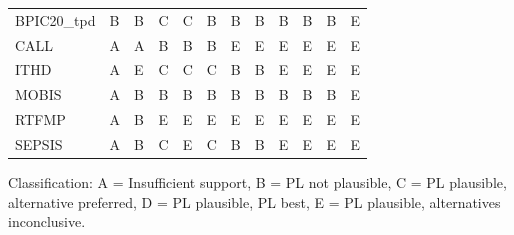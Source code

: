 \begin{tabular}{llllllllllll}
BPIC20\_tpd & \cellcolor[HTML]{D55E00} B & \cellcolor[HTML]{D55E00} B & \cellcolor[HTML]{E69F00} C & \cellcolor[HTML]{E69F00} C & \cellcolor[HTML]{D55E00} B & \cellcolor[HTML]{D55E00} B & \cellcolor[HTML]{D55E00} B & \cellcolor[HTML]{D55E00} B & \cellcolor[HTML]{D55E00} B & \cellcolor[HTML]{D55E00} B & \cellcolor[HTML]{56B4E9} E \\
       CALL & \cellcolor[HTML]{FFFFFF} A & \cellcolor[HTML]{FFFFFF} A & \cellcolor[HTML]{D55E00} B & \cellcolor[HTML]{D55E00} B & \cellcolor[HTML]{D55E00} B & \cellcolor[HTML]{56B4E9} E & \cellcolor[HTML]{56B4E9} E & \cellcolor[HTML]{56B4E9} E & \cellcolor[HTML]{56B4E9} E & \cellcolor[HTML]{56B4E9} E & \cellcolor[HTML]{56B4E9} E \\
       ITHD & \cellcolor[HTML]{FFFFFF} A & \cellcolor[HTML]{56B4E9} E & \cellcolor[HTML]{E69F00} C & \cellcolor[HTML]{E69F00} C & \cellcolor[HTML]{E69F00} C & \cellcolor[HTML]{D55E00} B & \cellcolor[HTML]{D55E00} B & \cellcolor[HTML]{56B4E9} E & \cellcolor[HTML]{56B4E9} E & \cellcolor[HTML]{56B4E9} E & \cellcolor[HTML]{56B4E9} E \\
      MOBIS & \cellcolor[HTML]{FFFFFF} A & \cellcolor[HTML]{D55E00} B & \cellcolor[HTML]{D55E00} B & \cellcolor[HTML]{D55E00} B & \cellcolor[HTML]{D55E00} B & \cellcolor[HTML]{D55E00} B & \cellcolor[HTML]{D55E00} B & \cellcolor[HTML]{D55E00} B & \cellcolor[HTML]{D55E00} B & \cellcolor[HTML]{D55E00} B & \cellcolor[HTML]{56B4E9} E \\
      RTFMP & \cellcolor[HTML]{FFFFFF} A & \cellcolor[HTML]{D55E00} B & \cellcolor[HTML]{56B4E9} E & \cellcolor[HTML]{56B4E9} E & \cellcolor[HTML]{56B4E9} E & \cellcolor[HTML]{56B4E9} E & \cellcolor[HTML]{56B4E9} E & \cellcolor[HTML]{56B4E9} E & \cellcolor[HTML]{56B4E9} E & \cellcolor[HTML]{56B4E9} E & \cellcolor[HTML]{56B4E9} E \\
     SEPSIS & \cellcolor[HTML]{FFFFFF} A & \cellcolor[HTML]{D55E00} B & \cellcolor[HTML]{E69F00} C & \cellcolor[HTML]{56B4E9} E & \cellcolor[HTML]{E69F00} C & \cellcolor[HTML]{D55E00} B & \cellcolor[HTML]{D55E00} B & \cellcolor[HTML]{56B4E9} E & \cellcolor[HTML]{56B4E9} E & \cellcolor[HTML]{56B4E9} E & \cellcolor[HTML]{56B4E9} E \\
\bottomrule
\end{tabular}
\begin{center}\footnotesize
Classification: A = Insufficient support, B = PL not plausible, C = PL plausible, alternative preferred, D = PL plausible, PL best, E = PL plausible, alternatives inconclusive.
\end{center}
